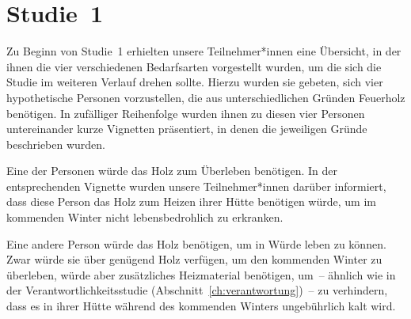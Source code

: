 \documentclass[justified,nobib,nohyper,symmetric,twoside]{tufte-book}
\begin{document}
\section{Studie~1}\label{sec:bedarfsarten_1}
Zu Beginn von Studie~1 erhielten unsere Teilnehmer*innen eine Übersicht, in der ihnen die vier verschiedenen Bedarfsarten vorgestellt wurden, um die sich die Studie im weiteren Verlauf drehen sollte.
Hierzu wurden sie gebeten, sich vier hypothetische Personen vorzustellen, die aus unterschiedlichen Gründen Feuerholz benötigen.
In zufälliger Reihenfolge wurden ihnen zu diesen vier Personen untereinander kurze Vignetten präsentiert, in denen die jeweiligen Gründe beschrieben wurden.

Eine der Personen würde das Holz zum Überleben benötigen.
In der entsprechenden Vignette wurden unsere Teilnehmer*innen darüber informiert, dass diese Person das Holz zum Heizen ihrer Hütte benötigen würde, um im kommenden Winter nicht lebensbedrohlich zu erkranken.

Eine andere Person würde das Holz benötigen, um in Würde leben zu können.
Zwar würde sie über genügend Holz verfügen, um den kommenden Winter zu überleben, würde aber zusätzliches Heizmaterial benötigen, um~-- ähnlich wie in der Verantwortlichkeitsstudie (Abschnitt~\ref{ch:verantwortung})~-- zu verhindern, dass es in ihrer Hütte während des kommenden Winters ungebührlich kalt wird.
\end{document}
